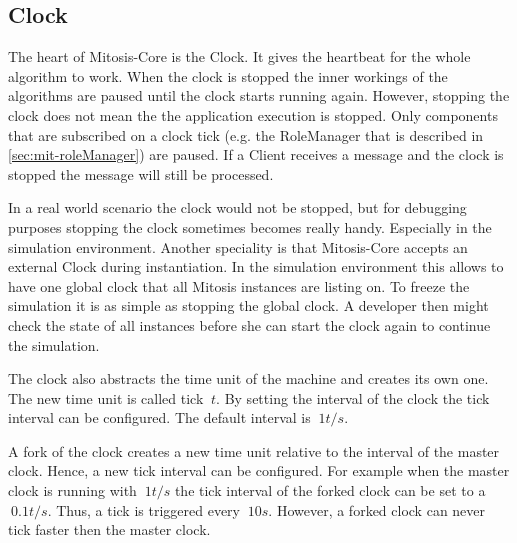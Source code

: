 \subsection{Clock}\label{sec:mit-clock}
The heart of Mitosis-Core is the Clock. It gives the heartbeat for the whole algorithm to work. When the clock is stopped the inner workings of the algorithms are paused until the clock starts running again. However, stopping the clock does not mean the the application execution is stopped. Only components that are subscribed on a clock tick (e.g. the RoleManager that is described in \vref{sec:mit-roleManager}) are paused. If a Client receives a message and the clock is stopped the message will still be processed.

In a real world scenario the clock would not be stopped, but for debugging purposes stopping the clock sometimes becomes really handy. Especially in the simulation environment. Another speciality is that Mitosis-Core accepts an external Clock during instantiation. In the simulation environment this allows to have one global clock that all Mitosis instances are listing on. 
To freeze the simulation it is as simple as stopping the global clock. A developer then might check the state of all instances before she can start the clock again to continue the simulation.

The clock also abstracts the time unit of the machine and creates its own one. The new time unit is called tick $\ t $. By setting the interval of the clock the tick interval can be configured. The default interval is $\ 1t/s $.

A fork of the clock creates a new time unit relative to the interval of the master clock. Hence, a new tick interval can be configured. For example when the master clock is running with $\ 1t/s $ the tick interval of the forked clock can be set to a $\ 0.1t/s $. Thus, a tick is triggered every $\ 10s $. However, a forked clock can never tick faster then the master clock.
